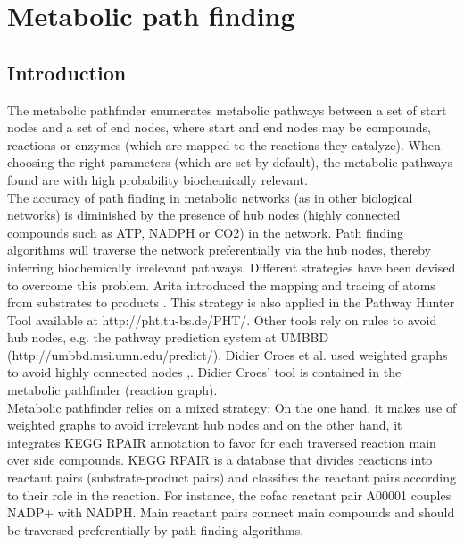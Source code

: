 \chapter{Metabolic path finding}

\section{Introduction}

The metabolic pathfinder enumerates metabolic pathways between a set of start nodes
and a set of end nodes, where start and end nodes may be compounds, reactions or enzymes (which are mapped to the reactions
they catalyze). When choosing the right parameters (which are set by default), the metabolic pathways found are with high
probability biochemically relevant.\\

The accuracy of path finding in metabolic networks (as in other biological networks) is diminished by the presence of
hub nodes (highly connected compounds such as ATP, NADPH or CO2) in the network.
Path finding algorithms will traverse the network preferentially via the hub nodes,
thereby inferring biochemically irrelevant pathways.
Different strategies have been devised to overcome this problem. Arita introduced the mapping and tracing of atoms
from substrates to products \cite{Arita2003}. This strategy is also applied in the Pathway Hunter Tool available at http://pht.tu-bs.de/PHT/.
Other tools rely on rules to avoid hub nodes, e.g. the pathway prediction system at UMBBD (http://umbbd.msi.umn.edu/predict/).
Didier Croes et al. used weighted graphs to avoid highly connected nodes \cite{croes05},\cite{croes06}. Didier Croes' tool is
contained in the metabolic pathfinder (reaction graph).\\

Metabolic pathfinder relies on a mixed strategy: On the one hand, it makes use of weighted graphs to avoid irrelevant
hub nodes and on the other hand, it integrates KEGG RPAIR annotation \cite{Kotera2004} to favor for each traversed
reaction main over side compounds.
KEGG RPAIR is a database that divides reactions into reactant pairs (substrate-product pairs) and classifies the reactant
pairs according to their role in the reaction. For instance, the cofac reactant pair A00001 couples NADP+ with NADPH.
Main reactant pairs connect main compounds and should be traversed preferentially by path finding algorithms.\\

